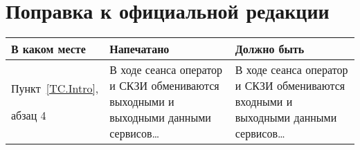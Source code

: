 \clearpage
\chapter*{\mbox{}\hfill Поправка к официальной редакции\hfill\mbox{}}

\mbox{}

{\small
\noindent
\begin{tabular}{|p{3.2cm}|p{6.25cm}|p{6.25cm}|}
\hline
В каком месте & Напечатано & Должно быть\\
\hline
\hline
Пункт~\ref{TC.Intro},\par
абзац 4
&
В ходе сеанса оператор и СКЗИ обмениваются выходными и выходными данными 
сервисов\ldots 
&
В ходе сеанса оператор и СКЗИ обмениваются входными и выходными данными 
сервисов\ldots
\\
\hline
\end{tabular}
}